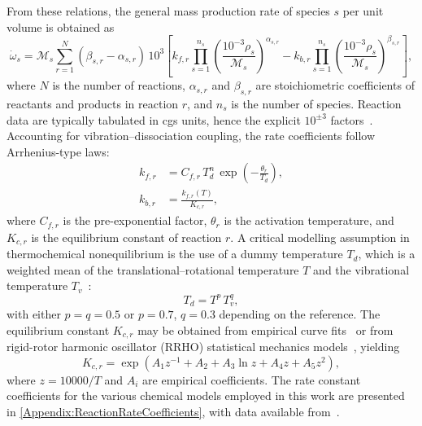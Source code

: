 From these relations, the general mass production rate of species $s$ per unit volume is obtained as~\citep{Gnoffo1989}
\begin{equation}\label{equation:wdot}
    \dot{\omega}_s = \mathcal{M}_s \sum_{r=1}^{N} (\beta_{s,r}-\alpha_{s,r}) \,10^3
    \left[
        k_{f,r}\prod_{s=1}^{n_s}\left(\frac{10^{-3}\rho_s}{\mathcal{M}_s}\right)^{\alpha_{s,r}}
        - k_{b,r}\prod_{s=1}^{n_s}\left(\frac{10^{-3}\rho_s}{\mathcal{M}_s}\right)^{\beta_{s,r}}
    \right],
\end{equation}
where $N$ is the number of reactions, $\alpha_{s,r}$ and $\beta_{s,r}$ are stoichiometric coefficients of reactants and products in reaction $r$, and $n_s$ is the number of species. Reaction data are typically tabulated in cgs units, hence the explicit $10^{\pm 3}$ factors~\citep{Gnoffo1989,Park1990,ParkEtAl2001}. Accounting for vibration--dissociation coupling, the rate coefficients follow Arrhenius-type laws:
\begin{align}
    k_{f,r} &= C_{f,r}\,T_d^{n}\,\exp\!\left(-\frac{\theta_r}{T_d}\right), \\
    k_{b,r} &= \frac{k_{f,r}(T)}{K_{c,r}},
\end{align}
where $C_{f,r}$ is the pre-exponential factor, $\theta_r$ is the activation temperature, and $K_{c,r}$ is the equilibrium constant of reaction $r$.  A critical modelling assumption in thermochemical nonequilibrium is the use of a dummy temperature $T_d$, which is a weighted mean of the translational--rotational temperature $T$ and the vibrational temperature $T_v$~\citep{Park1990}:
\begin{equation}\label{equation:twotemperature}
    T_d = T^{p} \, T_v^{q},
\end{equation}
with either $p=q=0.5$ or $p=0.7$, $q=0.3$ depending on the reference. The equilibrium constant $K_{c,r}$ may be obtained from empirical curve fits~\citep{Park1985} or from rigid-rotor harmonic oscillator (RRHO) statistical mechanics models~\citep{miromiroThesis}, yielding
\begin{equation}
    K_{c,r} = \exp\!\left(A_1 z^{-1} + A_2 + A_3 \ln z + A_4 z + A_5 z^2 \right),
\end{equation}
where $z=10000/T$ and $A_i$ are empirical coefficients. The rate constant coefficients for the various chemical models employed in this work are presented in \autoref{Appendix:ReactionRateCoefficients}, with data available from~\citep{Park1985,Park1990,ParkEtAl2001}. 





